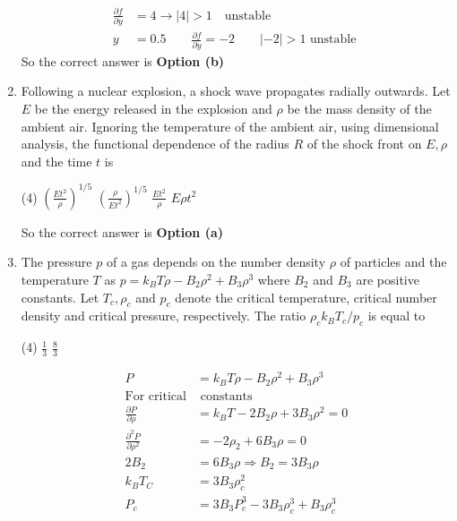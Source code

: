 \begin{enumerate}
\begin{answer}
\begin{align*}
	\frac{\partial f}{\partial y}&=4 \rightarrow|4|>1\quad\text{unstable}\\
	y&=0.5 \qquad \frac{\partial f}{\partial y}=-2\qquad  |-2|>1 \text { unstable }
	\end{align*}
		So the correct answer is \textbf{Option (b)}
\end{answer}
\item Following a nuclear explosion, a shock wave propagates radially outwards. Let $E$ be the energy released in the explosion and $\rho$ be the mass density of the ambient air. Ignoring the temperature of the ambient air, using dimensional analysis, the functional dependence of the radius $R$ of the shock front on $E, \rho$ and the time $t$ is
 \begin{tasks}(4)
	\task[\textbf{a.}]$\left(\frac{E t^{2}}{\rho}\right)^{1 / 5}$
	\task[\textbf{b.}]$\left(\frac{\rho}{E t^{2}}\right)^{1 / 5}$
	\task[\textbf{c.}]$\frac{E t^{2}}{\rho}$
	\task[\textbf{d.}] $E \rho t^{2}$
\end{tasks}
\begin{answer}
	So the correct answer is \textbf{Option (a)}
\end{answer}
\item The pressure $p$ of a gas depends on the number density $\rho$ of particles and the temperature $T$ as $p=k_{B} T \rho-B_{2} \rho^{2}+B_{3} \rho^{3}$ where $B_{2}$ and $B_{3}$ are positive constants. Let $T_{c}, \rho_{c}$ and $p_{c}$ denote the critical temperature, critical number density and critical pressure, respectively. The ratio $\rho_{c} k_{B} T_{c} / p_{c}$ is equal to
 \begin{tasks}(4)
	\task[\textbf{a.}]$\frac{1}{3}$
	\task[\textbf{c.}]$\frac{8}{3}$
\end{tasks}
\begin{answer}
	\begin{align*}
	P&=k_{B} T \rho-B_{2} \rho^{2}+B_{3} \rho^{3}\\
	\text{For critical}&\text{ constants}\\
	\frac{\partial P}{\partial \rho}&=k_{B} T-2 B_{2} \rho+3 B_{3} \rho^{2}=0 \\
	\frac{\partial^{2} P}{\partial \rho^{2}}&=-2 \rho_{2}+6 B_{3} \rho=0 \\
	2 B_{2}&=6 B_{3} \rho \Rightarrow B_{2}=3 B_{3} \rho \\
	k_{B} T_{C}&=3 B_{3} \rho_{c}^{2} \\
	P_{c}&=3 B_{3} P_{c}^{3}-3 B_{3} \rho_{c}^{3}+B_{3} \rho_{c}^{3}\\

\end{align*}
\end{answer}
\end{enumerate}
